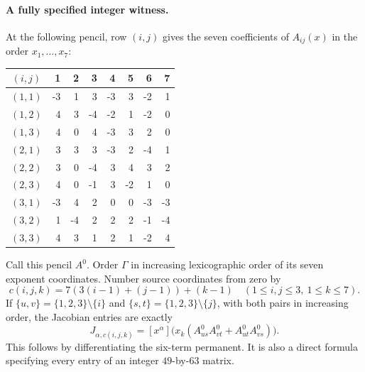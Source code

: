 \paragraph{A fully specified integer witness.}
At the following pencil, row \((i,j)\) gives the seven
coefficients of \(A_{ij}(x)\) in the order
\(x_1,\ldots,x_7\):
\begin{center}
\begin{tabular}{@{}c|rrrrrrr@{}}
\toprule
\((i,j)\)&1&2&3&4&5&6&7\\\midrule
\((1,1)\)&-3&1&3&-3&3&-2&1\\
\((1,2)\)&4&3&-4&-2&1&-2&0\\
\((1,3)\)&4&0&4&-3&3&2&0\\
\((2,1)\)&3&3&3&-3&2&-4&1\\
\((2,2)\)&3&0&-4&3&4&3&2\\
\((2,3)\)&4&0&-1&3&-2&1&0\\
\((3,1)\)&-3&4&2&0&0&-3&-3\\
\((3,2)\)&1&-4&2&2&2&-1&-4\\
\((3,3)\)&4&3&1&2&1&-2&4\\\bottomrule
\end{tabular}
\end{center}
Call this pencil \(A^0\). Order \(\Gamma\) in increasing
lexicographic order of its seven exponent coordinates.
Number source coordinates from zero by
\[
                 c(i,j,k)=7(3(i-1)+(j-1))+(k-1)
 \quad(1\leq i,j\leq3,\ 1\leq k\leq7).
\]
If \(\{u,v\}=\{1,2,3\}\setminus\{i\}\) and
\(\{s,t\}=\{1,2,3\}\setminus\{j\}\), with both
pairs in increasing order, the Jacobian entries are exactly
\[
 J_{\alpha,c(i,j,k)}
   =[x^\alpha]\bigl(x_k
       (A^0_{us}A^0_{vt}+A^0_{ut}A^0_{vs})\bigr).
                                                               \tag{F-025.4}
\]
This follows by differentiating the six-term permanent.
It is also a direct formula specifying every entry of
an integer \(49\)-by-\(63\) matrix.

